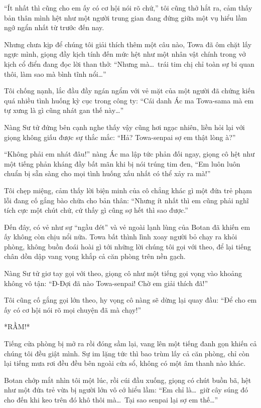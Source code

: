 \documentclass[../main.tex]{subfiles}
\begin{document}
``Ít nhất thì cũng cho em ấy có cơ hội nói rõ chứ,'' tôi cũng thở hắt ra, cảm thấy bản thân mình hệt như một người trung gian đang đứng giữa một vụ hiểu lầm ngớ ngẩn nhất từ trước đến nay.

Nhưng chưa kịp để chúng tôi giải thích thêm một câu nào, Towa đã ôm chặt lấy ngực mình, giọng đầy kịch tính đến mức hệt như một nhân vật chính trong vở kịch cổ điển đang đọc lời than thở: ``Nhưng mà\dots\ trái tim chị chỉ toàn sự bi quan thôi, làm sao mà bình tĩnh nổi\dots''

Tôi chống nạnh, lắc đầu đầy ngán ngẩm với vẻ mặt của một người đã chứng kiến quá nhiều tình huống kỳ cục trong công ty: ``Cái danh Ác ma Towa-sama mà em tự xưng là gì cũng nhát gan thế này\dots''

Nàng Sư tử đứng bên cạnh nghe thấy vậy cũng hơi ngạc nhiên, liền hỏi lại với giọng không giấu được sự thắc mắc: ``Hả? Towa-senpai sợ em thật lòng à?''

``Không phải em nhát đâu!'' nàng Ác ma lập tức phản đối ngay, giọng cô hệt như một tiếng phản kháng đầy bất mãn khi bị nói trúng tim đen, ``Em luôn luôn chuẩn bị sẵn sàng cho mọi tình huống xấu nhất có thể xảy ra mà!''

Tôi chẹp miệng, cảm thấy lời biện minh của cô chẳng khác gì một đứa trẻ phạm lỗi đang cố gắng bào chữa cho bản thân: ``Nhưng ít nhất thì em cũng phải nghĩ tích cực một chút chứ, cứ thấy gì cũng sợ hết thì sao được.''

Đến đây, có vẻ như sự ``ngầu đét'' và vẻ ngoài lạnh lùng của Botan đã khiến em ấy không còn chịu nổi nữa. Towa bất thình lình xoay người bỏ chạy ra khỏi phòng, không buồn đoái hoài gì tới những lời chúng tôi gọi với theo, để lại tiếng chân dồn dập vang vọng khắp cả căn phòng trên nền gạch.


Nàng Sư tử giơ tay gọi với theo, giọng cô như một tiếng gọi vọng vào khoảng không vô tận: ``Đ-Đợi đã nào Towa-senpai! Chờ em giải thích đã!''

Tôi cũng cố gắng gọi lớn theo, hy vọng cô nàng sẽ dừng lại quay đầu: ``Để cho em ấy có cơ hội nói rõ mọi chuyện đã mà chạy!''

*RẦM!*

Tiếng cửa phòng bị mở ra rồi đóng sầm lại, vang lên một tiếng đanh gọn khiến cả chúng tôi đều giật mình. Sự im lặng tức thì bao trùm lấy cả căn phòng, chỉ còn lại tiếng mưa rơi đều đều bên ngoài cửa sổ, không có một âm thanh nào khác.

Botan chớp mắt nhìn tôi một lúc, rồi cúi đầu xuống, giọng có chút buồn bã, hệt như một đứa trẻ vừa bị người lớn vô cớ hiểu lầm: ``Em chỉ là\dots\ giữ cây súng đó cho đến khi keo trên đó khô thôi mà\dots\ Tại sao senpai lại sợ em thế\dots''
\end{document}
